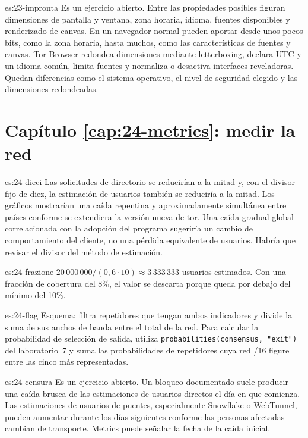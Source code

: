 \begin{soluzione}{es:23-impronta}
Es un ejercicio abierto. Entre las propiedades posibles figuran dimensiones de pantalla y ventana, zona horaria, idioma, fuentes disponibles y renderizado de canvas. En un navegador normal pueden aportar desde unos pocos bits, como la zona horaria, hasta muchos, como las características de fuentes y canvas. Tor Browser redondea dimensiones mediante letterboxing, declara UTC y un idioma común, limita fuentes y normaliza o desactiva interfaces reveladoras. Quedan diferencias como el sistema operativo, el nivel de seguridad elegido y las dimensiones redondeadas.
\end{soluzione}

\section*{Capítulo \ref{cap:24-metrics}: medir la red}

\begin{soluzione}{es:24-dieci}
Las solicitudes de directorio se reducirían a la mitad y, con el divisor fijo de diez, la estimación de usuarios también se reduciría a la mitad. Los gráficos mostrarían una caída repentina y aproximadamente simultánea entre países conforme se extendiera la versión nueva de tor. Una caída gradual global correlacionada con la adopción del programa sugeriría un cambio de comportamiento del cliente, no una pérdida equivalente de usuarios. Habría que revisar el divisor del método de estimación.
\end{soluzione}

\begin{soluzione}{es:24-frazione}
$20\,000\,000/(0{,}6\cdot10)\approx3\,333\,333$ usuarios estimados. Con una fracción de cobertura del 8\%, el valor se descarta porque queda por debajo del mínimo del 10\%.
\end{soluzione}

\begin{soluzione}{es:24-flag}
Esquema: filtra repetidores que tengan ambos indicadores y divide la suma de sus anchos de banda entre el total de la red. Para calcular la probabilidad de selección de salida, utiliza \texttt{probabilities(consensus, "exit")} del laboratorio~7 y suma las probabilidades de repetidores cuya red /16 figure entre las cinco más representadas.
\end{soluzione}

\begin{soluzione}{es:24-censura}
Es un ejercicio abierto. Un bloqueo documentado suele producir una caída brusca de las estimaciones de usuarios directos el día en que comienza. Las estimaciones de usuarios de puentes, especialmente Snowflake o WebTunnel, pueden aumentar durante los días siguientes conforme las personas afectadas cambian de transporte. Metrics puede señalar la fecha de la caída inicial.
\end{soluzione}

